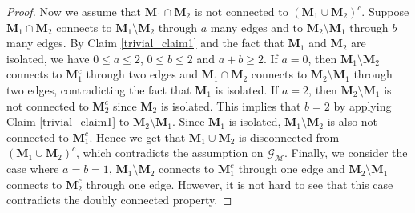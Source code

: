 \documentclass{article}
\newcommand{\1}{\mathds{1}}
\numberwithin{equation}{section}
\renewcommand{\cal}{\mathcal}
\renewcommand{\leq}{\leqslant}
\renewcommand{\geq}{\geqslant}
\renewcommand{\le}{\leq}
\renewcommand{\ge}{\geq}
\theoremstyle{plain} %
\theoremstyle{remark}
\newcommand{\Pol}{{\mathbf{M}}}
\begin{document}
\begin{proof}
Now we assume that $\Pol_1\cap \Pol_2$ is not connected to $(\Pol_1\cup \Pol_2)^c$. Suppose $\Pol_1\cap \Pol_2$ connects to $\Pol_1\setminus \Pol_2$ through $a$ many edges and to $\Pol_2\setminus \Pol_1$ through $b$ many edges. By Claim \ref{trivial_claim1} and the fact that $\Pol_1$ and $\Pol_2$ are isolated, we have $0\le a\le 2$, $0\le b\le 2$ and $a+b\ge 2$. If $a=0$, then $\Pol_1\setminus \Pol_2$ connects to $\Pol_1^c$ through two edges and $\Pol_1\cap \Pol_2$ connects to $\Pol_2\setminus \Pol_1$ through two edges, contradicting the fact that $\Pol_1$ is isolated. If $a=2$, then $\Pol_2\setminus \Pol_1$ is not connected to $\Pol_2^c$ since $\Pol_2$ is isolated. This implies that $b=2$ by applying Claim \ref{trivial_claim1} to $\Pol_2\setminus \Pol_1$. Since $\Pol_1$ is isolated, $\Pol_1\setminus \Pol_2$ is also not connected to $\Pol_1^c$. Hence we get that $\Pol_1\cup \Pol_2$ is disconnected from $(\Pol_1\cup \Pol_2)^c$, which contradicts the assumption on $\cal G_{\cal M}$. Finally, we consider the case where $a=b=1$, $\Pol_1\setminus \Pol_2$ connects to $\Pol_1^c$ through one edge and $\Pol_2\setminus \Pol_1$ connects to $\Pol_2^c$ through one edge. However, it is not hard to see that this case contradicts the doubly connected property.
\end{proof}
\end{document}
